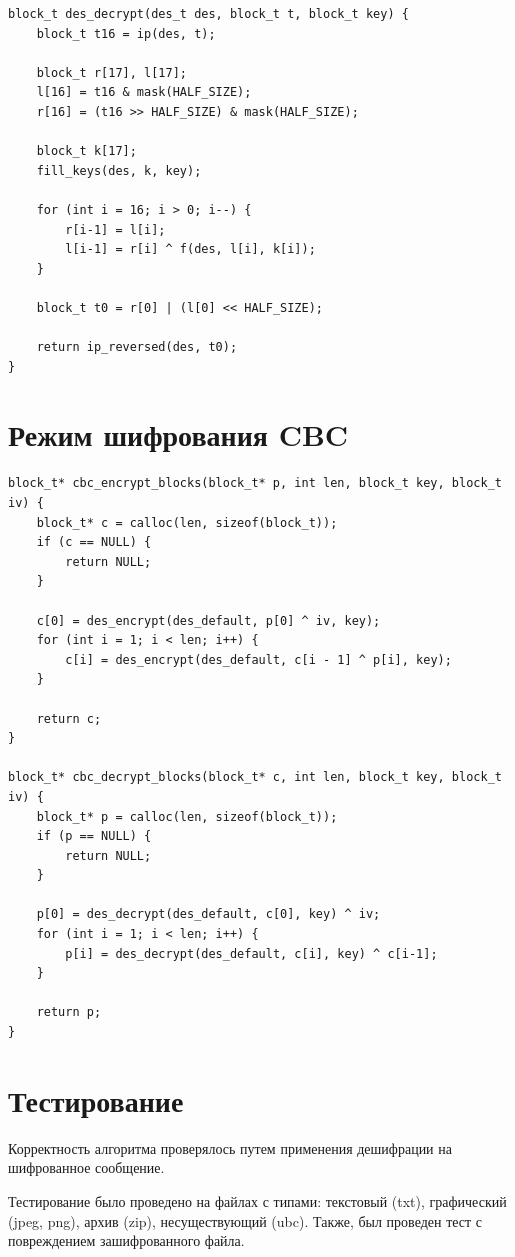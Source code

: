 \begin{lstlisting}[label=des,caption=Реализация алгоритма шифрования DES]
block_t des_decrypt(des_t des, block_t t, block_t key) {
    block_t t16 = ip(des, t);

    block_t r[17], l[17];
    l[16] = t16 & mask(HALF_SIZE);
    r[16] = (t16 >> HALF_SIZE) & mask(HALF_SIZE);

    block_t k[17];
    fill_keys(des, k, key);

    for (int i = 16; i > 0; i--) {
        r[i-1] = l[i];
        l[i-1] = r[i] ^ f(des, l[i], k[i]);
    }

    block_t t0 = r[0] | (l[0] << HALF_SIZE);

    return ip_reversed(des, t0);
}
	\end{lstlisting}

\section{Режим шифрования CBC}
\begin{lstlisting}[label=des,caption=Реализация режима шифрования CBC]
block_t* cbc_encrypt_blocks(block_t* p, int len, block_t key, block_t iv) {
    block_t* c = calloc(len, sizeof(block_t));
    if (c == NULL) {
        return NULL;
    }

    c[0] = des_encrypt(des_default, p[0] ^ iv, key);
    for (int i = 1; i < len; i++) {
        c[i] = des_encrypt(des_default, c[i - 1] ^ p[i], key);
    }

    return c;
}

block_t* cbc_decrypt_blocks(block_t* c, int len, block_t key, block_t iv) {
    block_t* p = calloc(len, sizeof(block_t));
    if (p == NULL) {
        return NULL;
    }

    p[0] = des_decrypt(des_default, c[0], key) ^ iv;
    for (int i = 1; i < len; i++) {
        p[i] = des_decrypt(des_default, c[i], key) ^ c[i-1];
    }

    return p;
}
\end{lstlisting}	


\section{Тестирование}

Корректность алгоритма проверялось путем применения дешифрации на шифрованное сообщение.

Тестирование было проведено на файлах с типами: текстовый (txt), графический (jpeg, png), архив (zip), несуществующий (ubc). Также, был проведен тест с повреждением зашифрованного файла.

